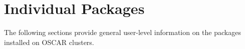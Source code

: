 %
%
%

\section{Individual Packages}

The following sections provide general user-level information on the
packages installed on OSCAR clusters.

